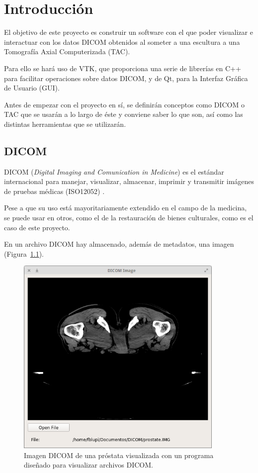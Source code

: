 \chapter{Introducción}
El objetivo de este proyecto es construir un software con el que poder visualizar e interactuar con los datos DICOM obtenidos al someter a una escultura a una Tomografía Axial Computerizada (TAC). 

Para ello se hará uso de VTK, que proporciona una serie de librerías en C++ para facilitar operaciones sobre datos DICOM, y de Qt, para la Interfaz Gráfica de Usuario (GUI).

Antes de empezar con el proyecto en sí, se definirán conceptos como DICOM o TAC que se usarán a lo largo de éste y conviene saber lo que son, así como las distintas herramientas que se utilizarán.

\section{DICOM}
DICOM (\textit{Digital Imaging and Comunication in Medicine}) es el estándar internacional para manejar, visualizar, almacenar, imprimir y transmitir imágenes de pruebas médicas (ISO12052) \cite{about_dicom}.

Pese a que su uso está mayoritariamente extendido en el campo de la medicina, se puede usar en otros, como el de la restauración de bienes culturales, como es el caso de este proyecto.

En un archivo DICOM hay almacenado, además de metadatos, una imagen \cite{dicom_classes_vtk} (Figura~\ref{fig:prostate_dicom}).

\begin{figure}[H]
	\centering
	\includegraphics[width=10cm]{imagenes/prostate_dicom}
	\caption{Imagen DICOM de una próstata visualizada con un programa diseñado para visualizar archivos DICOM.}
	\label{fig:prostate_dicom}
\end{figure}

